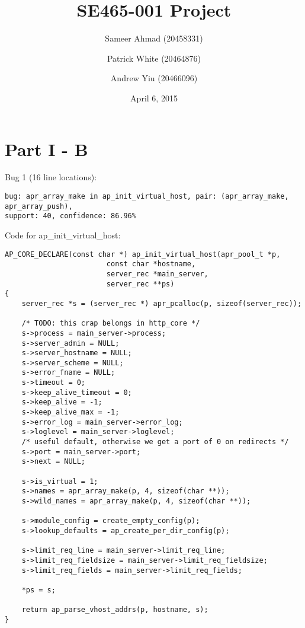 \documentclass[12pt]{article}
\title{SE465-001 Project}
\author{Sameer Ahmad (20458331) \and Patrick White (20464876) \and Andrew Yiu (20466096)}
\date{April 6, 2015}
\begin{document}
\maketitle
\pagebreak
\section*{Part I - B}
Bug 1 (16 line locations):
\begin{lstlisting}
bug: apr_array_make in ap_init_virtual_host, pair: (apr_array_make, apr_array_push),
support: 40, confidence: 86.96%
\end{lstlisting}
Code for ap\_init\_virtual\_host:
\begin{lstlisting}
AP_CORE_DECLARE(const char *) ap_init_virtual_host(apr_pool_t *p,
						const char *hostname,
						server_rec *main_server,
						server_rec **ps)
{
	server_rec *s = (server_rec *) apr_pcalloc(p, sizeof(server_rec));
	
	/* TODO: this crap belongs in http_core */
	s->process = main_server->process;
	s->server_admin = NULL;
	s->server_hostname = NULL;
	s->server_scheme = NULL;
	s->error_fname = NULL;
	s->timeout = 0;
	s->keep_alive_timeout = 0;
	s->keep_alive = -1;
	s->keep_alive_max = -1;
	s->error_log = main_server->error_log;
	s->loglevel = main_server->loglevel;
	/* useful default, otherwise we get a port of 0 on redirects */
	s->port = main_server->port;
	s->next = NULL;
	
	s->is_virtual = 1;
	s->names = apr_array_make(p, 4, sizeof(char **));
	s->wild_names = apr_array_make(p, 4, sizeof(char **));
	
	s->module_config = create_empty_config(p);
	s->lookup_defaults = ap_create_per_dir_config(p);
	
	s->limit_req_line = main_server->limit_req_line;
	s->limit_req_fieldsize = main_server->limit_req_fieldsize;
	s->limit_req_fields = main_server->limit_req_fields;
	
	*ps = s;
	
	return ap_parse_vhost_addrs(p, hostname, s);
}
\end{lstlisting}
\end{document}
